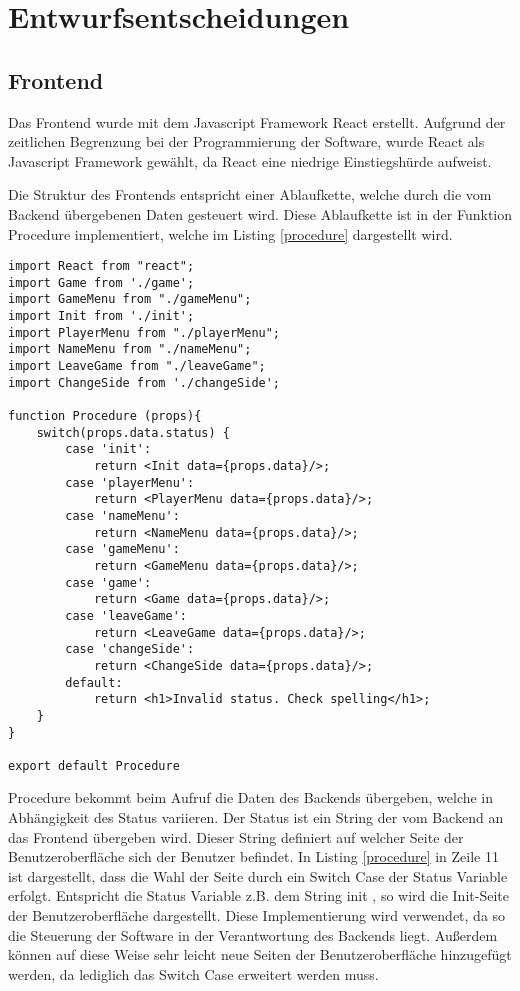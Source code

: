 \chapter{Entwurfsentscheidungen}
\section{Frontend}
Das Frontend wurde mit dem Javascript Framework React erstellt. Aufgrund der zeitlichen Begrenzung bei der Programmierung der Software, wurde React als Javascript Framework gewählt, da React eine niedrige Einstiegshürde aufweist. 

Die Struktur des Frontends entspricht einer Ablaufkette, welche durch die vom Backend übergebenen Daten gesteuert wird. Diese Ablaufkette ist in der Funktion Procedure implementiert, welche im Listing \ref{procedure} dargestellt wird.

\begin{lstlisting}[caption={Procedure Funktion des Frontends},captionpos=b]
import React from "react";
import Game from './game';
import GameMenu from "./gameMenu";
import Init from './init';
import PlayerMenu from "./playerMenu";
import NameMenu from "./nameMenu";
import LeaveGame from "./leaveGame";
import ChangeSide from './changeSide';

function Procedure (props){
    switch(props.data.status) {
        case 'init':
            return <Init data={props.data}/>;
        case 'playerMenu':
            return <PlayerMenu data={props.data}/>;
        case 'nameMenu':
            return <NameMenu data={props.data}/>;
        case 'gameMenu':
            return <GameMenu data={props.data}/>;
        case 'game':
            return <Game data={props.data}/>;
        case 'leaveGame':
            return <LeaveGame data={props.data}/>;
        case 'changeSide':
            return <ChangeSide data={props.data}/>;
        default:
            return <h1>Invalid status. Check spelling</h1>;
    }
}

export default Procedure
\end{lstlisting}
\label{procedure}

Procedure bekommt beim Aufruf die Daten des Backends übergeben, welche in Abhängigkeit des Status variieren. Der Status ist ein String der vom Backend an das Frontend übergeben wird. Dieser String definiert auf welcher Seite der Benutzeroberfläche sich der Benutzer befindet. In Listing \ref{procedure} in Zeile 11 ist dargestellt, dass die Wahl der Seite durch ein Switch Case der Status Variable erfolgt. Entspricht die Status Variable z.B. dem String \glqq init\grqq{} , so wird die Init-Seite der Benutzeroberfläche dargestellt. Diese Implementierung wird verwendet, da so die Steuerung der Software in der Verantwortung des Backends liegt. Außerdem können auf diese Weise sehr leicht neue Seiten der Benutzeroberfläche hinzugefügt werden, da lediglich das Switch Case erweitert werden muss.


